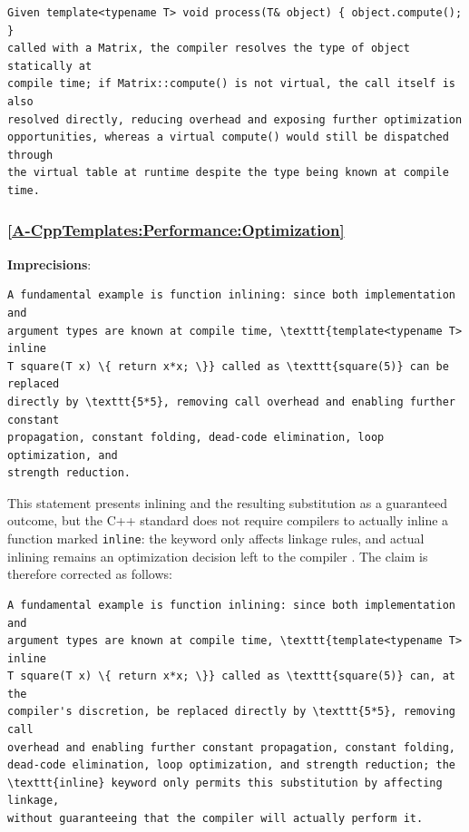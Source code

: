 \documentclass[11pt]{report}
\begin{document}
\begin{Verbatim}[breaklines=true]
Given template<typename T> void process(T& object) { object.compute(); }
called with a Matrix, the compiler resolves the type of object statically at
compile time; if Matrix::compute() is not virtual, the call itself is also
resolved directly, reducing overhead and exposing further optimization
opportunities, whereas a virtual compute() would still be dispatched through
the virtual table at runtime despite the type being known at compile time.
\end{Verbatim}

\subsubsection*{\hyperref[A-CppTemplates:Performance:Optimization]{\ref*{A-CppTemplates:Performance:Optimization} }}
\noindent\textbf{Imprecisions}:

\begin{Verbatim}[breaklines=true]
A fundamental example is function inlining: since both implementation and
argument types are known at compile time, \texttt{template<typename T> inline
T square(T x) \{ return x*x; \}} called as \texttt{square(5)} can be replaced
directly by \texttt{5*5}, removing call overhead and enabling further constant
propagation, constant folding, dead-code elimination, loop optimization, and
strength reduction.
\end{Verbatim}

This statement presents inlining and the resulting substitution as a
guaranteed outcome, but the C++ standard does not require compilers to
actually inline a function marked \texttt{inline}: the keyword only affects
linkage rules, and actual inlining remains an optimization decision left to
the compiler \cite{iso_cpp2024}. The claim is therefore corrected as follows:

\begin{Verbatim}[breaklines=true]
A fundamental example is function inlining: since both implementation and
argument types are known at compile time, \texttt{template<typename T> inline
T square(T x) \{ return x*x; \}} called as \texttt{square(5)} can, at the
compiler's discretion, be replaced directly by \texttt{5*5}, removing call
overhead and enabling further constant propagation, constant folding,
dead-code elimination, loop optimization, and strength reduction; the
\texttt{inline} keyword only permits this substitution by affecting linkage,
without guaranteeing that the compiler will actually perform it.
\end{Verbatim}
\end{document}
